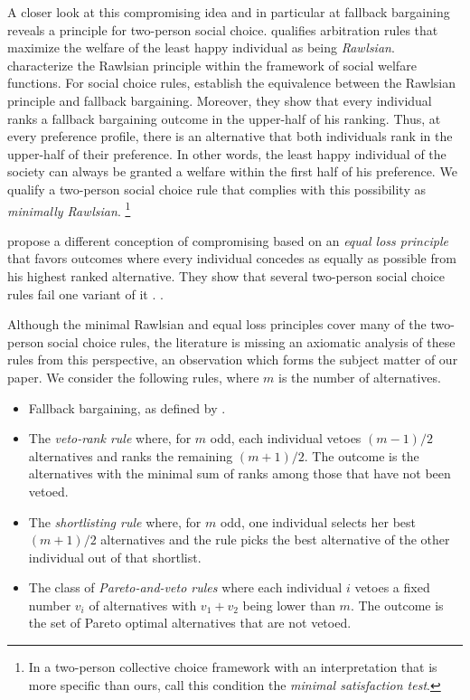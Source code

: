 \documentclass[version=3.21, pagesize, twoside=off, bibliography=totoc, DIV=calc, fontsize=12pt, a4paper]{scrartcl}
\begin{document}
A closer look at this compromising idea and in particular at fallback bargaining reveals a principle for two-person social choice.  qualifies arbitration rules that maximize the welfare of the least happy individual as being \textit{Rawlsian}. \citet{congar2012characterization} characterize the Rawlsian principle within the framework of social welfare functions. For social choice rules, \citet{BramsKilgour2001} establish the equivalence between the Rawlsian principle and fallback bargaining. Moreover, they show that every individual ranks a fallback bargaining outcome in the upper-half of his ranking. Thus, at every preference profile, there is an alternative that both individuals rank in the upper-half of their preference. In other words, the least happy individual of the society can always be granted a welfare within the first half of his preference. We qualify a two-person social choice rule that complies with this possibility as \textit{minimally Rawlsian}.%
\footnote{In a two-person collective choice framework with an interpretation that is more specific than ours, \citet{Clippel} call this condition the \textit{minimal satisfaction test}.}

 propose a different conception of compromising based on an \textit{equal loss principle} that favors outcomes where every individual concedes as equally as possible from his highest ranked alternative. They show that several two-person social choice rules fail one variant of it . .

Although the minimal Rawlsian and equal loss principles cover many of the two-person social choice rules, the literature is missing an axiomatic analysis of these rules from this perspective, an observation which forms the subject matter of our paper. We consider the following rules, where $m$ is the number of alternatives.
\begin{itemize}
	\item Fallback bargaining, as defined by \citet{BramsKilgour2001}.
	\item The \textit{veto-rank rule} where, for $m$ odd, each individual vetoes $(m - 1) / 2$ alternatives and ranks the remaining $(m+1) / 2$. The outcome is the alternatives with the minimal sum of ranks among those that have not been vetoed.
	\item The \textit{shortlisting rule} where, for $m$ odd, one individual selects her best $(m+1) / 2$ alternatives and the rule picks the best alternative of the other individual out of that shortlist.
	\item The class of \textit{Pareto-and-veto rules} where each individual $i$ vetoes a fixed number $v_i$ of alternatives with $v_1 + v_2$ being lower than $m$. The outcome is the set of Pareto optimal alternatives that are not vetoed. 
\end{itemize}
\end{document}
